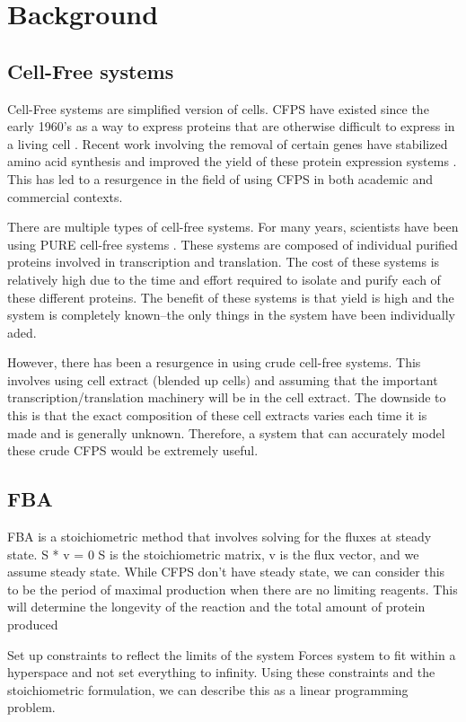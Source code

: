 \chapter{Background}

\section{Cell-Free systems}
Cell-Free systems are simplified version of cells.
CFPS have existed since the early 1960's as a way to express proteins that are otherwise difficult to express in a living cell \cite{nirenberg1961dependence}.
Recent work involving the removal of certain genes have stabilized amino acid synthesis and improved the yield of these protein expression systems \cite{calhoun2006total}.
This has led to a resurgence in the field of using CFPS in both academic and commercial contexts.

There are multiple types of cell-free systems.
For many years, scientists have been using PURE cell-free systems \cite{}.
These systems are composed of individual purified proteins involved in transcription and translation.
The cost of these systems is relatively high due to the time and effort required to isolate and purify each of these different proteins.
The benefit of these systems is that yield is high and the system is completely known--the only things in the system have been individually aded.

However, there has been a resurgence in using crude cell-free systems.
This involves using cell extract (blended up cells) and assuming that the important transcription/translation machinery will be in the cell extract.
The downside to this is that the exact composition of these cell extracts varies each time it is made and is generally unknown.
Therefore, a system that can accurately model these crude CFPS would be extremely useful.

\section{FBA}
FBA is a stoichiometric method that involves solving for the fluxes at steady state.
S * v = 0
S is the stoichiometric matrix, v is the flux vector, and we assume steady state.
While CFPS don't have steady state, we can consider this to be the period of maximal production when there are no limiting reagents.
This will determine the longevity of the reaction and the total amount of protein produced

Set up constraints to reflect the limits of the system
Forces system to fit within a hyperspace and not set everything to infinity.
Using these constraints and the stoichiometric formulation, we can describe this as a linear programming problem.

